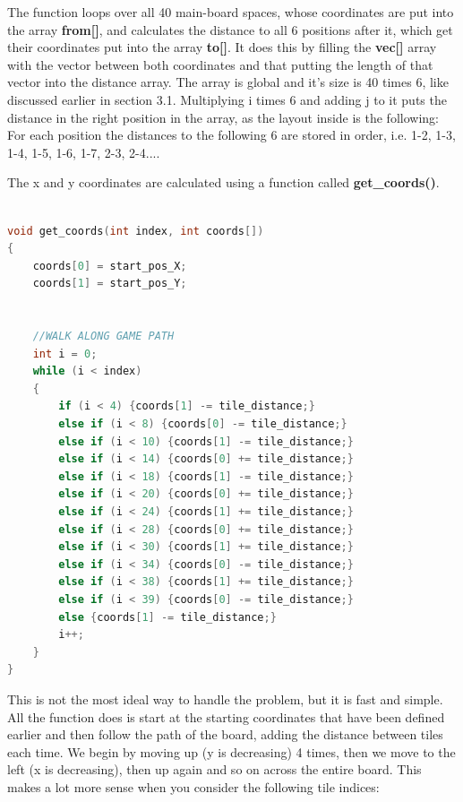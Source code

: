 \documentclass[12pt]{article}
\begin{document}
The function loops over all 40 main-board spaces, whose coordinates are put into the array \textbf{from[]}, and calculates the distance to all 6 positions after it, which get their coordinates put into the array \textbf{to[]}. It does this by filling the \textbf{vec[]} array with the vector between both coordinates and that putting the length of that vector into the distance array. The array is global and it's size is 40 times 6, like discussed earlier in section 3.1. Multiplying i times 6 and adding j to it puts the distance in the right position in the array, as the layout inside is the following:
For each position the distances to the following 6 are stored in order, i.e. 1-2, 1-3, 1-4, 1-5, 1-6, 1-7, 2-3, 2-4....
\linebreak

The x and y coordinates are calculated using a function called \textbf{get\_coords()}.
\linebreak

\begin{lstlisting}[language=C, caption={Distance calculation}, label={lst:distance calculation}]

void get_coords(int index, int coords[])
{
    coords[0] = start_pos_X;
    coords[1] = start_pos_Y;


    //WALK ALONG GAME PATH
    int i = 0;
    while (i < index)
    {    
        if (i < 4) {coords[1] -= tile_distance;}
        else if (i < 8) {coords[0] -= tile_distance;}
        else if (i < 10) {coords[1] -= tile_distance;}
        else if (i < 14) {coords[0] += tile_distance;}
        else if (i < 18) {coords[1] -= tile_distance;}
        else if (i < 20) {coords[0] += tile_distance;}
        else if (i < 24) {coords[1] += tile_distance;}
        else if (i < 28) {coords[0] += tile_distance;}
        else if (i < 30) {coords[1] += tile_distance;}
        else if (i < 34) {coords[0] -= tile_distance;}
        else if (i < 38) {coords[1] += tile_distance;}
        else if (i < 39) {coords[0] -= tile_distance;}
        else {coords[1] -= tile_distance;}
        i++;
    }
}
\end{lstlisting}

This is not the most ideal way to handle the problem, but it is fast and simple. All the function does is start at the starting coordinates that have been defined earlier and then follow the path of the board, adding the distance between tiles each time. We begin by moving up (y is decreasing) 4 times, then we move to the left (x is decreasing), then up again and so on across the entire board.
This makes a lot more sense when you consider the following tile indices:
\end{document}
